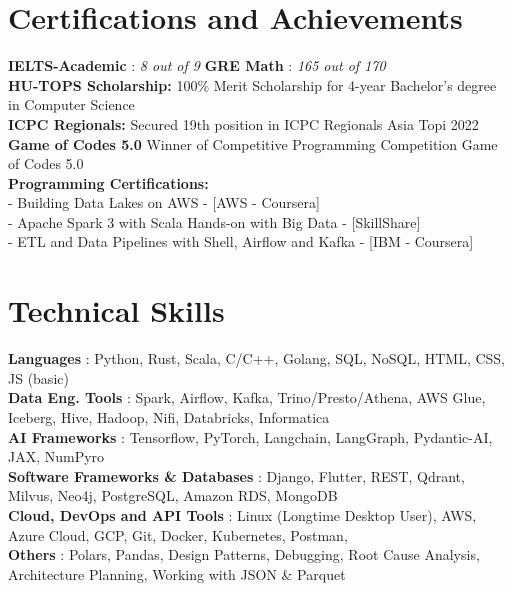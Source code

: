 \documentclass[letterpaper,10pt]{article}
\newcommand{\sectionspace}{
\vspace{-15pt}
}
\newcommand{\subheadingtitlevspace}{
\vspace{-3pt}
}
\newcommand{\titleItem}[1]{
  \textbf{#1}
}
\begin{document}
\section{Certifications and Achievements}
\subheadingtitlevspace
\begin{itemize}[leftmargin=0.15in, label={}]
	{\item{
          \titleItem{IELTS-Academic}{: \textit{8 out of 9}} \hspace{4.25cm} \titleItem{GRE Math}{: \textit{165 out of 170}} \\
          \titleItem{HU-TOPS Scholarship:}{100\% Merit Scholarship for 4-year Bachelor's degree in Computer Science} \\
          \titleItem{ICPC Regionals:}{Secured 19th position in ICPC Regionals Asia Topi 2022} \\
          \titleItem{Game of Codes 5.0}{Winner of Competitive Programming Competition Game of Codes 5.0 } \\
            \textbf{Programming Certifications:}\\
            - Building Data Lakes on AWS - [AWS - Coursera]\\
            - Apache Spark 3 with Scala Hands-on with Big Data - [SkillShare]\\
            - ETL and Data Pipelines with Shell, Airflow and Kafka - [IBM - Coursera]\\
	}}
\end{itemize}


\sectionspace

\section{Technical Skills}
\subheadingtitlevspace
\begin{itemize}[leftmargin=0.15in, label={}]
	{\item{
          \titleItem{Languages}{: Python, Rust, Scala, C/C++, Golang, SQL,
          NoSQL, HTML, CSS, JS (basic)} \\
          \titleItem{Data Eng. Tools}{: Spark, Airflow, Kafka, Trino/Presto/Athena, AWS Glue, Iceberg, Hive, Hadoop, Nifi, Databricks, Informatica}\\
          \titleItem{AI Frameworks}{: Tensorflow, PyTorch, Langchain, LangGraph, Pydantic-AI, JAX, NumPyro}\\
          \titleItem{Software Frameworks \& Databases}{: Django, Flutter, REST, Qdrant, Milvus, Neo4j, PostgreSQL, Amazon RDS, MongoDB}\\
          \titleItem{Cloud, DevOps and API Tools}{: Linux (Longtime Desktop User), AWS, Azure Cloud, GCP, Git, Docker, Kubernetes, Postman,} \\
          \titleItem{Others}{: Polars, Pandas, Design Patterns, Debugging, Root
          Cause Analysis, Architecture Planning, Working with JSON \& Parquet}
	}}
\end{itemize}
\sectionspace

\end{document}
